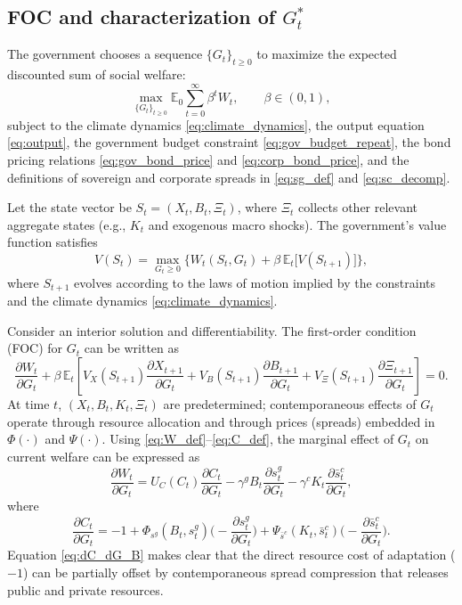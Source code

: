 \documentclass[12pt]{article}
\def\E{\mathbb{E}}
\begin{document}
\subsection{FOC and characterization of $G_t^*$}
\label{subsec:FOC_optG_B}

The government chooses a sequence $\{G_t\}_{t \ge 0}$ to maximize the
expected discounted sum of social welfare:
\begin{equation}
  \max_{\{G_t\}_{t \ge 0}} 
  \E_0 \sum_{t=0}^\infty \beta^t W_t,
  \qquad \beta \in (0,1),
  \label{eq:gov_problem}
\end{equation}
subject to the climate dynamics \eqref{eq:climate_dynamics}, the output
equation \eqref{eq:output}, the government budget constraint
\eqref{eq:gov_budget_repeat}, the bond pricing relations
\eqref{eq:gov_bond_price} and \eqref{eq:corp_bond_price}, and the
definitions of sovereign and corporate spreads in
\eqref{eq:sg_def} and \eqref{eq:sc_decomp}.

Let the state vector be $S_t = (X_t, B_t, \Xi_t)$, where $\Xi_t$ collects
other relevant aggregate states (e.g., $K_t$ and exogenous macro shocks).
The government's value function satisfies
\begin{equation}
  V(S_t)
  =
  \max_{G_t \ge 0} 
  \Big\{
    W_t(S_t, G_t)
    + \beta\, \E_t\big[ V(S_{t+1}) \big]
  \Big\},
  \label{eq:Bellman}
\end{equation}
where $S_{t+1}$ evolves according to the laws of motion implied by the
constraints and the climate dynamics \eqref{eq:climate_dynamics}.

Consider an interior solution and differentiability. The first-order condition (FOC) for $G_t$ can be written as
\begin{equation}
  \frac{\partial W_t}{\partial G_t}
  +\beta\,\mathbb{E}_t\!\left[
    V_X(S_{t+1})\frac{\partial X_{t+1}}{\partial G_t}
    +V_B(S_{t+1})\frac{\partial B_{t+1}}{\partial G_t}
    +V_{\Xi}(S_{t+1})\frac{\partial \Xi_{t+1}}{\partial G_t}
  \right] = 0.
  \label{eq:FOC_general_B}
\end{equation}
At time $t$, $(X_t,B_t,K_t,\Xi_t)$ are predetermined; contemporaneous effects of $G_t$ operate through resource allocation
and through prices (spreads) embedded in $\Phi(\cdot)$ and $\Psi(\cdot)$. Using \eqref{eq:W_def}--\eqref{eq:C_def},
the marginal effect of $G_t$ on current welfare can be expressed as
\begin{equation}
  \frac{\partial W_t}{\partial G_t}
  =
  U_C(C_t)\frac{\partial C_t}{\partial G_t}
  - \gamma^g B_t\frac{\partial s^g_t}{\partial G_t}
  - \gamma^c K_t\frac{\partial \bar s^c_t}{\partial G_t},
  \label{eq:dW_dG_B}
\end{equation}
where
\begin{equation}
  \frac{\partial C_t}{\partial G_t}
  = -1 + \Phi_{s^g}(B_t,s^g_t)\Big(-\frac{\partial s^g_t}{\partial G_t}\Big)
      + \Psi_{\bar s^c}(K_t,\bar s^c_t)\Big(-\frac{\partial \bar s^c_t}{\partial G_t}\Big).
  \label{eq:dC_dG_B}
\end{equation}
Equation \eqref{eq:dC_dG_B} makes clear that the direct resource cost of adaptation ($-1$) can be partially offset by
contemporaneous spread compression that releases public and private resources.
\end{document}
